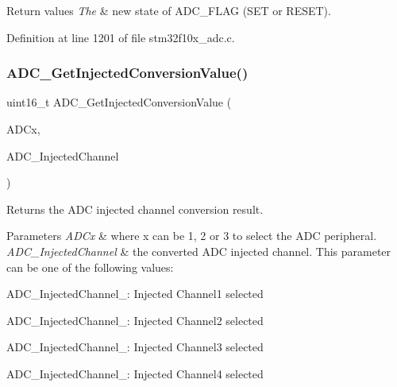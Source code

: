\begin{DoxyRetVals}{Return values}
{\em The} & new state of A\+D\+C\+\_\+\+F\+L\+AG (S\+ET or R\+E\+S\+ET). \\
\hline
\end{DoxyRetVals}


Definition at line 1201 of file stm32f10x\+\_\+adc.\+c.

\mbox{\label{group___a_d_c___exported___functions_ga1dea5ed24571a2e0ce4cbd41c9c1ec46}} 
\subsubsection{\texorpdfstring{A\+D\+C\+\_\+\+Get\+Injected\+Conversion\+Value()}{ADC\_GetInjectedConversionValue()}}
{\footnotesize\ttfamily uint16\+\_\+t A\+D\+C\+\_\+\+Get\+Injected\+Conversion\+Value (\begin{DoxyParamCaption}\item[{\hyperlink{struct_a_d_c___type_def}{A\+D\+C\+\_\+\+Type\+Def} $\ast$}]{A\+D\+Cx,  }\item[{uint8\+\_\+t}]{A\+D\+C\+\_\+\+Injected\+Channel }\end{DoxyParamCaption})}



Returns the A\+DC injected channel conversion result. 


\begin{DoxyParams}{Parameters}
{\em A\+D\+Cx} & where x can be 1, 2 or 3 to select the A\+DC peripheral. \\
\hline
{\em A\+D\+C\+\_\+\+Injected\+Channel} & the converted A\+DC injected channel. This parameter can be one of the following values\+: \begin{DoxyItemize}
\item A\+D\+C\+\_\+\+Injected\+Channel\+\_\+: Injected Channel1 selected \item A\+D\+C\+\_\+\+Injected\+Channel\+\_\+: Injected Channel2 selected \item A\+D\+C\+\_\+\+Injected\+Channel\+\_\+: Injected Channel3 selected \item A\+D\+C\+\_\+\+Injected\+Channel\+\_\+: Injected Channel4 selected \end{DoxyItemize}
\\
\hline
\end{DoxyParams}

